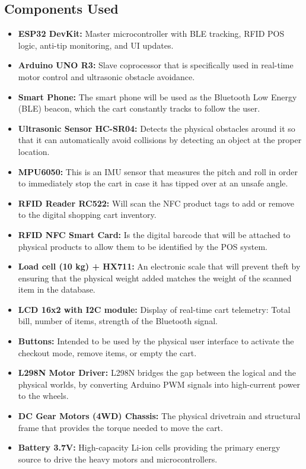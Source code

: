 \documentclass[12pt,a4paper]{article}
\begin{document}
\subsection{Components Used}
\begin{itemize}
    \item \textbf{ESP32 DevKit:} Master microcontroller with BLE tracking, RFID POS logic, anti-tip monitoring, and UI updates.
    \item \textbf{Arduino UNO R3:} Slave coprocessor that is specifically used in real-time motor control and ultrasonic obstacle avoidance.
    \item \textbf{Smart Phone:} The smart phone will be used as the Bluetooth Low Energy (BLE) beacon, which the cart constantly tracks to follow the user.
    \item \textbf{Ultrasonic Sensor HC-SR04:} Detects the physical obstacles around it so that it can automatically avoid collisions by detecting an object at the proper location. 
    \item \textbf{MPU6050:} This is an IMU sensor that measures the pitch and roll in order to immediately stop the cart in case it has tipped over at an unsafe angle.
    \item \textbf{RFID Reader RC522:} Will scan the NFC product tags to add or remove to the digital shopping cart inventory.
    \item \textbf{RFID NFC Smart Card:} Is the digital barcode that will be attached to physical products to allow them to be identified by the POS system. 
    \item \textbf{Load cell (10 kg) + HX711:} An electronic scale that will prevent theft by ensuring that the physical weight added matches the weight of the scanned item in the database. 
    \item \textbf{LCD 16x2 with I2C module:}  Display of real-time cart telemetry: Total bill, number of items, strength of the Bluetooth signal.
    \item \textbf{Buttons:}  Intended to be used by the physical user interface to activate the checkout mode, remove items, or empty the cart. 
    \item \textbf{L298N Motor Driver:}  L298N bridges the gap between the logical and the physical worlds, by converting Arduino PWM signals into high-current power to the wheels.
    \item \textbf{DC Gear Motors (4WD) Chassis:} The physical drivetrain and structural frame that provides the torque needed to move the cart.
    \item \textbf{Battery 3.7V:} High-capacity Li-ion cells providing the primary energy source to drive the heavy motors and microcontrollers.

\end{itemize}
\end{document}
